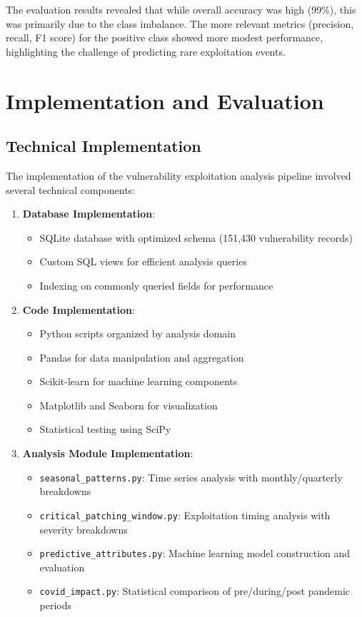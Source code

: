 \documentclass[runningheads]{llncs}
\begin{document}
The evaluation results revealed that while overall accuracy was high (99\%), this was primarily due to the class imbalance. The more relevant metrics (precision, recall, F1 score) for the positive class showed more modest performance, highlighting the challenge of predicting rare exploitation events.

\section{Implementation and Evaluation}
\label{sec:implementation_evaluation}

\subsection{Technical Implementation}
The implementation of the vulnerability exploitation analysis pipeline involved several technical components:

\begin{enumerate}
    \item \textbf{Database Implementation}:
    \begin{itemize}
        \item SQLite database with optimized schema (151,430 vulnerability records)
        \item Custom SQL views for efficient analysis queries
        \item Indexing on commonly queried fields for performance
    \end{itemize}
    
    \item \textbf{Code Implementation}:
    \begin{itemize}
        \item Python scripts organized by analysis domain
        \item Pandas for data manipulation and aggregation
        \item Scikit-learn for machine learning components
        \item Matplotlib and Seaborn for visualization
        \item Statistical testing using SciPy
    \end{itemize}
    
    \item \textbf{Analysis Module Implementation}:
    \begin{itemize}
        \item \texttt{seasonal\_patterns.py}: Time series analysis with monthly/quarterly breakdowns
        \item \texttt{critical\_patching\_window.py}: Exploitation timing analysis with severity breakdowns
        \item \texttt{predictive\_attributes.py}: Machine learning model construction and evaluation
        \item \texttt{covid\_impact.py}: Statistical comparison of pre/during/post pandemic periods
    \end{itemize}
\end{enumerate}
\end{document}
